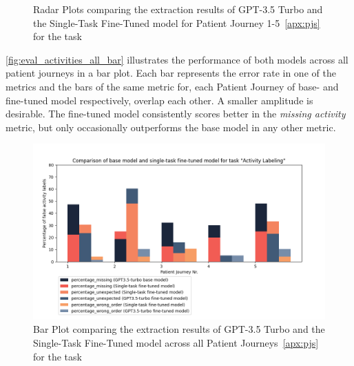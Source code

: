 \begin{figure}
  \caption{Radar Plots comparing the extraction results of GPT-3.5 Turbo and the Single-Task Fine-Tuned model for Patient Journey 1-5~\ref{apx:pjs} for the task }
  \label{fig:eval_activities_single_rad}
\end{figure}
\autoref{fig:eval_activities_all_bar} illustrates the performance of both models across all patient journeys in a bar plot. Each bar represents the error rate in one of the metrics and the bars of the same metric for, each Patient Journey of base- and fine-tuned model respectively, overlap each other. A smaller amplitude is desirable. The fine-tuned model consistently scores better in the \emph{missing activity} metric, but only occasionally outperforms the base model in any other metric.
\begin{figure}
    \centering
    \includegraphics[width=\textwidth]{bachelor_thesis/images/activites_all-single.png}
    \caption{Bar Plot comparing the extraction results of GPT-3.5 Turbo and the Single-Task Fine-Tuned model across all Patient Journeys~\ref{apx:pjs} for the task } 
    \label{fig:eval_activities_all_bar}
\end{figure}

